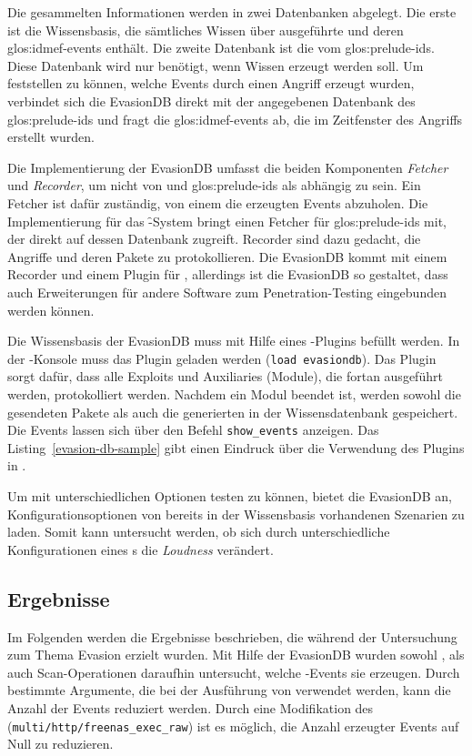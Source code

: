 Die gesammelten Informationen werden in zwei Datenbanken abgelegt. Die
erste ist die Wissensbasis, die sämtliches Wissen über ausgeführte
 und deren \glspl{glos:idmef-event} enthält. Die zweite
Datenbank ist die vom \gls{glos:prelude-ids}. Diese Datenbank wird nur
benötigt, wenn Wissen erzeugt werden soll. Um feststellen zu können,
welche Events durch einen Angriff erzeugt wurden, verbindet sich die
EvasionDB direkt mit der angegebenen Datenbank des
\gls{glos:prelude-ids} und fragt die \glspl{glos:idmef-event} ab, die im
Zeitfenster des Angriffs erstellt wurden.

Die Implementierung der EvasionDB umfasst die beiden Komponenten
\textit{Fetcher} und \textit{Recorder}, um nicht von  und
\gls{glos:prelude-ids} als  abhängig zu sein. Ein Fetcher ist
dafür zuständig, von einem  die erzeugten Events
abzuholen. Die Implementierung für das \f-System bringt einen
Fetcher für \gls{glos:prelude-ids} mit, der direkt auf dessen
Datenbank zugreift. Recorder sind dazu gedacht, die Angriffe und deren
Pakete zu protokollieren. Die EvasionDB kommt mit einem Recorder und
einem Plugin für , allerdings ist die EvasionDB so gestaltet,
dass auch Erweiterungen für andere Software zum Penetration-Testing
eingebunden werden können.

Die Wissensbasis der EvasionDB muss mit Hilfe eines -Plugins
befüllt werden. In der -Konsole muss das Plugin geladen
werden (\texttt{load evasiondb}). Das Plugin sorgt dafür, dass alle
Exploits und Auxiliaries (Module), die fortan ausgeführt werden,
protokolliert werden. Nachdem ein Modul beendet ist, werden sowohl die
gesendeten Pakete als auch die generierten  in der
Wissensdatenbank gespeichert. Die Events lassen sich über den Befehl
\texttt{show\_events} anzeigen. Das Listing~\ref{evasion-db-sample} gibt einen Eindruck
über die Verwendung des Plugins in .

Um  mit unterschiedlichen Optionen testen zu können, bietet
die EvasionDB an, Konfigurationsoptionen von bereits in der
Wissensbasis vorhandenen Szenarien zu laden. Somit kann untersucht werden, ob sich durch
unterschiedliche Konfigurationen eines s die \textit{Loudness}
verändert.

\subsection{Ergebnisse}

Im Folgenden werden die Ergebnisse beschrieben, die während der Untersuchung
zum Thema Evasion erzielt wurden. Mit Hilfe der EvasionDB wurden sowohl ,
als auch Scan-Operationen daraufhin untersucht, welche -Events sie erzeugen.
Durch bestimmte Argumente, die bei der Ausführung von  verwendet werden, kann die Anzahl
der Events reduziert werden. Durch eine Modifikation des
 (\texttt{multi/http/freenas\_exec\_raw}) ist es möglich, die Anzahl
erzeugter Events auf Null zu reduzieren.

